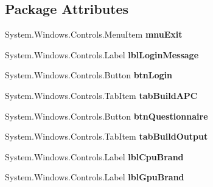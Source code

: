 \subsection*{Package Attributes}
\begin{DoxyCompactItemize}
\item 
System.\+Windows.\+Controls.\+Menu\+Item {\bfseries mnu\+Exit}\hypertarget{class_p_c_builder_forms_1_1_main_window_a53d466d670b9f69781a4139799ebe80b}{}\label{class_p_c_builder_forms_1_1_main_window_a53d466d670b9f69781a4139799ebe80b}

\item 
System.\+Windows.\+Controls.\+Label {\bfseries lbl\+Login\+Message}\hypertarget{class_p_c_builder_forms_1_1_main_window_a3d07af2e8da4efc0b3cc6d267e2bbd4d}{}\label{class_p_c_builder_forms_1_1_main_window_a3d07af2e8da4efc0b3cc6d267e2bbd4d}

\item 
System.\+Windows.\+Controls.\+Button {\bfseries btn\+Login}\hypertarget{class_p_c_builder_forms_1_1_main_window_ade2269fd046864f55446ebc6df1861cf}{}\label{class_p_c_builder_forms_1_1_main_window_ade2269fd046864f55446ebc6df1861cf}

\item 
System.\+Windows.\+Controls.\+Tab\+Item {\bfseries tab\+Build\+A\+PC}\hypertarget{class_p_c_builder_forms_1_1_main_window_ae351e6ef4dd06c9130510b0dfb0e42c6}{}\label{class_p_c_builder_forms_1_1_main_window_ae351e6ef4dd06c9130510b0dfb0e42c6}

\item 
System.\+Windows.\+Controls.\+Button {\bfseries btn\+Questionnaire}\hypertarget{class_p_c_builder_forms_1_1_main_window_a686049c1273b758aa8cb90d6df28c66e}{}\label{class_p_c_builder_forms_1_1_main_window_a686049c1273b758aa8cb90d6df28c66e}

\item 
System.\+Windows.\+Controls.\+Tab\+Item {\bfseries tab\+Build\+Output}\hypertarget{class_p_c_builder_forms_1_1_main_window_a8a08f6b04a5758d518c6a477eb760dc0}{}\label{class_p_c_builder_forms_1_1_main_window_a8a08f6b04a5758d518c6a477eb760dc0}

\item 
System.\+Windows.\+Controls.\+Label {\bfseries lbl\+Cpu\+Brand}\hypertarget{class_p_c_builder_forms_1_1_main_window_a4beec0d4e8d2f9be5a7a0e45065b40ae}{}\label{class_p_c_builder_forms_1_1_main_window_a4beec0d4e8d2f9be5a7a0e45065b40ae}

\item 
System.\+Windows.\+Controls.\+Label {\bfseries lbl\+Gpu\+Brand}\hypertarget{class_p_c_builder_forms_1_1_main_window_a55bff109b418e181a8b414800a16a63f}{}\label{class_p_c_builder_forms_1_1_main_window_a55bff109b418e181a8b414800a16a63f}


\end{DoxyCompactItemize}
